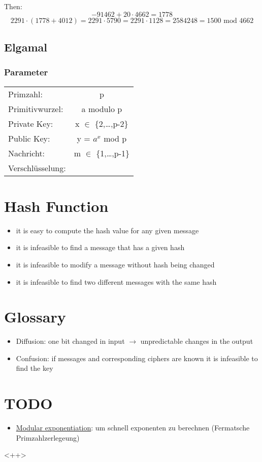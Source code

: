 \documentclass[a4paper]{article}
\begin{document}
Then:
\[ -91462 + 20 \cdot 4662 = 1778 \]
\[2291 \cdot (1778 + 4012) = 2291 \cdot 5790 = 2291 \cdot 1128 = 2584248 = 1500 \text{ mod } 4662\]
\subsection{Elgamal}
\subsubsection{Parameter}

\begin{table}[h]
	\centering
	\begin{tabular}{lc}
	Primzahl: & p\\

	Primitivwurzel: & a modulo p \\

	Private Key: & x $\in$ \{2,\dots,p-2\} \\

	Public Key: & y = $a^x$ mod p \\

	Nachricht: & m $\in$ \{1,\dots,p-1\} \\

	Verschlüsselung:


	\end{tabular}
\end{table}

\section{Hash Function}
\begin{itemize}
    \item it is easy to compute the hash value for any given message
    \item it is infeasible to find a message that has a given hash
    \item it is infeasible to modify a message without hash being changed
    \item it is infeasible to find two different messages with the same hash
\end{itemize}

\section{Glossary}
\begin{itemize}
    \item Diffusion: one bit changed in input $\rightarrow$ unpredictable changes in the output
    \item Confusion: if messages and corresponding ciphers are known it is infeasible to find the key
\end{itemize}

\section{TODO}

\begin{itemize}
    \item \href{http://en.wikipedia.org/wiki/Modular_exponentiation}{Modular exponentiation}: um schnell exponenten zu berechnen (Fermatsche Primzahlzerlegeung) 
\end{itemize}<++>
\end{document}
